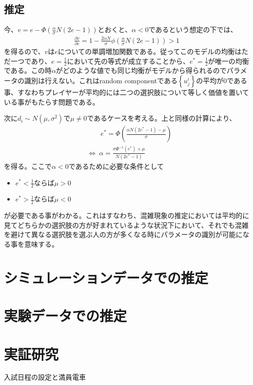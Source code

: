 \documentclass{jsarticle}
\begin{document}
\subsection{推定}
今、$v = e - \Phi \left(\frac{\alpha}{\sigma}N(2e - 1) \right)$とおくと、$\alpha < 0$であるという想定の下では、
\begin{align*}
	\frac{\partial v}{\partial e} = 1 - \frac{2\alpha N}{\sigma}\phi \left( \frac{\alpha}{\sigma}N(2e - 1) \right) > 1
\end{align*}
を得るので、$v$は$e$についての単調増加関数である。従ってこのモデルの均衡はただ一つであり、$e = \frac{1}{2}$において先の等式が成立することから、$e^* = \frac{1}{2}$が唯一の均衡である。この時$\alpha$がどのような値でも同じ均衡がモデルから得られるのでパラメータの識別は行えない。これはrandom componentである$\left\{u_j^i\right\}$の平均が0である事、すなわちプレイヤーが平均的には二つの選択肢について等しく価値を置いている事がもたらす問題である。

次に$d_i \sim N(\mu, \sigma^2)$で$\mu \neq 0$であるケースを考える。上と同様の計算により、
\begin{align*}
	&\qquad e^* = \Phi \left(\frac{\alpha N (2 e^* -1) - \mu}{\sigma}\right)\\[8pt]
	&\Leftrightarrow\ \alpha = \frac{\sigma \Phi^{-1}\left( e^* \right) + \mu}{N(2 e^* -1)}
\end{align*}
を得る。ここで$\alpha < 0$であるために必要な条件として
\begin{itemize}
	\item $e^* < \frac{1}{2}$ならば$\mu > 0$
	\item $e^* > \frac{1}{2}$ならば$\mu < 0$
\end{itemize}
が必要である事がわかる。これはすなわち、混雑現象の推定においては平均的に見てどちらかの選択肢の方が好まれているような状況下において、それでも混雑を避けて異なる選択肢を選ぶ人の方が多くなる時にパラメータの識別が可能になる事を意味する。



\section{シミュレーションデータでの推定}

\section{実験データでの推定}

\section{実証研究}
入試日程の設定と満員電車
\end{document}
